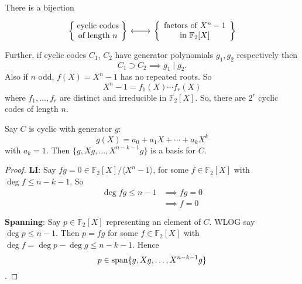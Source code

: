 \documentclass{article}
\newcommand{\F}{\mathbb{F}}
\newcommand{\1}[1]{\mathbbm{1}_{#1}}
\begin{document}
\begin{cor}
    There is a bijection
    \begin{equation*}
        \begin{tikzcd}
            \left\{\parbox{2cm}{\centering cyclic codes of length $n$}\right\} \ar[r, leftrightarrow] &
            \left\{\parbox{3cm}{\centering factors of $X^n - 1$ in $\F_2[X]$}\right\}
        \end{tikzcd}
    \end{equation*}
    Further, if cyclic codes $C_1$, $C_2$ have generator polynomials $g_1, g_2$ respectively then
    \begin{equation*}
        C_1 \supset C_2 \implies g_1 \mid g_2.
    \end{equation*}
    Also if $n$ odd, $f(X) = X^n - 1$ has no repeated roots. So
    \begin{equation*}
        X^n - 1 = f_1(X) \dotsm f_r(X)
    \end{equation*}
    where $f_1, \dotsc, f_r$ are distinct and irreducible in $\F_2[X]$.
    So, there are $2^r$ cyclic codes of length $n$.
\end{cor}
\begin{nlemma}
    Say $C$ is cyclic with generator $g$:
    \begin{equation*}
        g(X) = a_0 + a_1 X + \dotsb + a_k X^k
    \end{equation*}
    with $a_k = 1$. Then $\{g, Xg, \dotsc, X^{n-k-1} g\}$ is a basis for $C$.
\end{nlemma}
\begin{proof}
    \textbf{LI}: Say $fg = 0 \in \F_2[X]/\langle X^n - 1 \rangle$, for some $f \in \F_2[X]$ with $\deg f \leq n - k - 1$.
    So
    \begin{align*}
        \deg f g \leq n - 1 &\implies f g = 0 \\
                            &\implies f = 0
    \end{align*}

    \textbf{Spanning}: Say $p \in \F_2[X]$ representing an element of $C$. WLOG say $\deg p \leq n-1$.
    Then $p = f g$ for some $f \in \F_2[X]$ with $\deg f = \deg p - \deg g \leq n - k - 1$.
    Hence
    \begin{equation*}p \in \mathrm{span}\{g, Xg, \dotsc, X^{n-k-1} g\}\qedhere\end{equation*}.
\end{proof}
\end{document}
